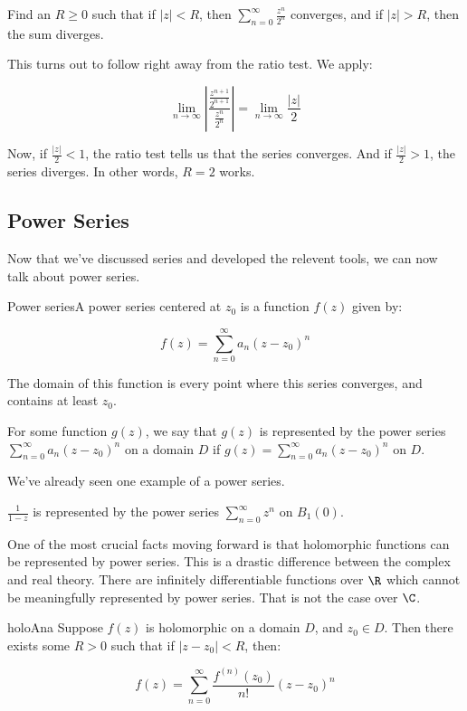 \begin{ex}{}{} Find an $R\ge 0$ such that if $|z| < R$, then $\sum_{n = 0}^\infty \frac{z^n}{2^n}$ converges, and if $|z| > R$, then the sum diverges.

This turns out to follow right away from the ratio test. We apply:

$$\lim_{n\rightarrow \infty} \left| \frac{\frac{z^{n+1}}{2^{n+1}}}{\frac{z^n}{2^n}}\right| = \lim_{n\rightarrow \infty} \frac{|z|}{2}$$

Now, if $\frac{|z|}{2} < 1$, the ratio test tells us that the series converges. And if $\frac{|z|}{2}> 1$, the series diverges. In other words, $R = 2$ works.
\end{ex}

\subsection{Power Series}

Now that we've discussed series and developed the relevent tools, we can now talk about power series.

\begin{defbo}{Power series}{}A power series centered at $z_0$ is a function $f(z)$ given by:

$$f(z) = \sum_{n = 0}^\infty a_n(z-z_0)^n$$

The domain of this function is every point where this series converges, and contains at least $z_0$.

For some function $g(z)$, we say that $g(z)$ is represented by the power series $\sum_{n = 0}^\infty a_n(z-z_0)^n$ on a domain $D$ if $g(z) = \sum_{n = 0}^\infty a_n(z-z_0)^n$ on $D$.
\end{defbo}

We've already seen one example of a power series.

\begin{ex}{}{} $\frac{1}{1-z}$ is represented by the power series $\sum_{n = 0}^\infty z^n$ on $B_1(0)$.\end{ex}

One of the most crucial facts moving forward is that holomorphic functions can be represented by power series. This is a drastic difference between the complex and real theory. There are infinitely differentiable functions over $\R$ which cannot be meaningfully represented by power series. That is not the case over $\C$.

\begin{thmbo}{}{holoAna} Suppose $f(z)$ is holomorphic on a domain $D$, and $z_0 \in D$. Then there exists some $R > 0$ such that if $|z- z_0| < R$, then:

$$f(z) = \sum_{n = 0}^\infty \frac{f^{(n)}(z_0)}{n!}(z-z_0)^n$$
\end{thmbo}

